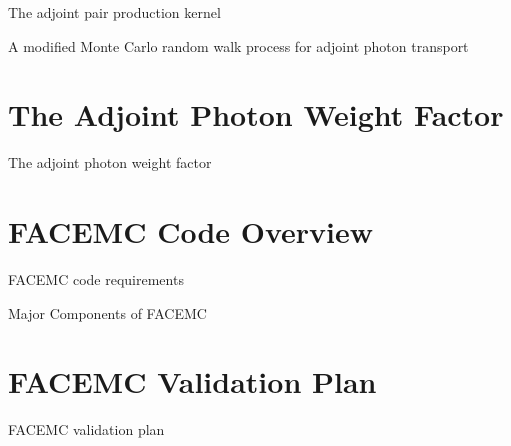 \documentclass{beamer}
\begin{document}
\begin{frame}{The adjoint pair production kernel}

\end{frame}

\begin{frame}{A modified Monte Carlo random walk process for adjoint photon transport}

\end{frame}

\section{The Adjoint Photon Weight Factor }
\begin{frame}{The adjoint photon weight factor}

\end{frame}

\section{FACEMC Code Overview}
\begin{frame}{FACEMC code requirements}

\end{frame}

\begin{frame}{Major Components of FACEMC}

\end{frame}

\section{FACEMC Validation Plan}
\begin{frame}{FACEMC validation plan}

\end{frame}
\end{document}
